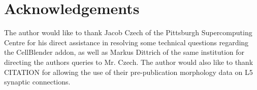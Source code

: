 \documentclass[a4paper]{article}
\begin{document}
\section{Acknowledgements}
The author would like to thank Jacob Czech of the Pittsburgh Supercomputing Centre for his direct assistance in resolving some technical questions regarding the CellBlender addon, as well as Markus Dittrich of the same institution for directing the authors queries to Mr. Czech. The author would also like to thank CITATION for allowing the use of their pre-publication morphology data on L5 synaptic connections.


{}

\end{document}
